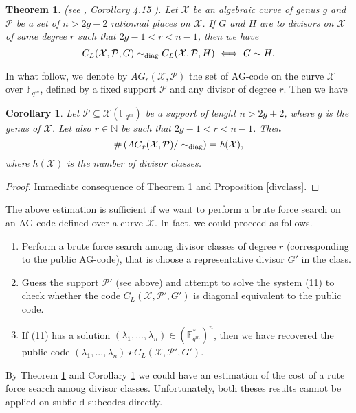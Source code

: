 \documentclass[10pt]{article}
\newtheorem{thm}{Theorem}[]
\newtheorem{coro1}{Corollary}[]
\newcommand{\s}{\vspace{0.3cm}}
\newcommand{\N}{\mathbb{N}}
\newcommand{\fqm}{\mathbb{F}_{q^m}}
\newcommand{\su}{\subseteq}
\newcommand{\X}{\mathcal{X}}
\newcommand{\PR}{\mathcal{P}}
\begin{document}
\s

\begin{thm} \label{thmequiv} \rm (\color{red}see \cite{CMRP}, Corollary 4.15 \color{black}). \it
Let $\X$ be an algebraic curve of genus $g$ and $\PR$ be a set of $n>2g-2$ rationnal places on $\X$. If $G$ and $H$ are to divisors on $\X$ of same degree $r$ such that $2g-1 < r < n-1$, then we have 
\[C_L(\X,\PR,G) \sim_{\rm diag} C_L(\X,\PR,H) \iff G \sim H.\]
\end{thm}

\s

In what follow, we denote by $AG_r(\X,\PR)$ the set of AG-code on the curve $\X$ over $\fqm$, defined by a fixed support $\PR$ and any divisor of degree $r$. Then we have 

\s

\begin{coro1} \label{nbAGr}
Let $\PR \su \X(\fqm)$ be a support of lenght $n > 2g+2$, where $g$ is the genus of $\X$. Let also $r \in \N$ be such that $2g-1 < r < n-1$. Then 
\[ \#\left(AG_r(\X,\PR)/ \sim_{\rm diag}\right) \it = h(\X),\]
where $h(\X)$ is the number of divisor classes.
\end{coro1}

\s

\begin{proof}
Immediate consequence of Theorem \ref{thmequiv} and Proposition \ref{divclass}.
\end{proof}

\s

The above estimation is sufficient if we want to perform a brute force search on an AG-code defined over a curve $\X$. In fact, we could proceed as follows.
\begin{enumerate}
\item Perform a brute force search among divisor classes of degree $r$ (corresponding to the public AG-code), that is choose a representative divisor $G'$ in the class.
\item Guess the support $\PR'$ (see above) and attempt to solve the system (11) to check whether the code $C_L(\X,\PR',G')$ is diagonal equivalent to the public code.
\item If (11) has a solution $(\lambda_1,...,\lambda_n) \in (\fqm^*)^n$, then we have recovered the public code $(\lambda_1,...,\lambda_n) \star C_L(\X,\PR',G')$.
\end{enumerate}

By Theorem \ref{thmequiv} and Corollary \ref{nbAGr} we could have an estimation of the cost of a rute force search amoug divisor classes. Unfortunately, both theses results cannot be applied on subfield subcodes directly.
\end{document}
